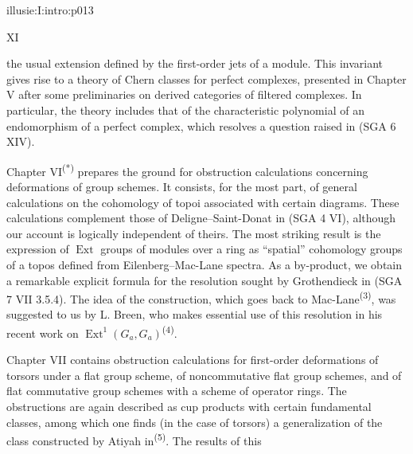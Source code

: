 \IllusieSetPhysicalPageSize{450.6bp}{704bp}
\begin{illusiefrontpage}{illusie:I:intro:p013}{}
\begin{center}\fontsize{10}{12}\selectfont XI\end{center}
\vspace{12bp}
\hypertarget{illusie:I:intro:p013:p1}{}%
the usual extension defined by the first-order jets of a module. This invariant
gives rise to a theory of Chern classes for perfect complexes, presented in
Chapter V after some preliminaries on derived categories of filtered complexes.
In particular, the theory includes that of the characteristic polynomial of an
endomorphism of a perfect complex, which resolves a question raised in
(SGA 6 XIV).

\vspace{4bp}
\hypertarget{illusie:I:intro:p013:p2}{}%
Chapter VI\textsuperscript{(*)} prepares the ground for obstruction calculations
concerning deformations of group schemes. It consists, for the most part, of
general calculations on the cohomology of topoi associated with certain diagrams.
These calculations complement those of Deligne--Saint-Donat in (SGA 4 VI),
although our account is logically independent of theirs. The most striking result
is the expression of $\operatorname{Ext}$ groups of modules over a ring as
``spatial'' cohomology groups of a topos defined from Eilenberg--Mac-Lane spectra.
As a by-product, we obtain a remarkable explicit formula for the resolution sought
by Grothendieck in (SGA 7 VII 3.5.4). The idea of the construction, which goes
back to Mac-Lane\textsuperscript{(3)}, was suggested to us by L. Breen, who makes
essential use of this resolution in his recent work on
$\operatorname{Ext}^{1}(G_a,G_a)$\textsuperscript{(4)}.

\vspace{4bp}
\hypertarget{illusie:I:intro:p013:p3}{}%
Chapter VII contains obstruction calculations for first-order deformations of
torsors under a flat group scheme, of noncommutative flat group schemes, and of
flat commutative group schemes with a scheme of operator rings. The obstructions
are again described as cup products with certain fundamental classes, among which
one finds (in the case of torsors) a generalization of the class constructed by
Atiyah in\textsuperscript{(5)}. The results of this

\IllusieNoteRule
{}\hypertarget{illusie:I:intro:p013:ns}{}%
\hypertarget{illusie:I:intro:p013:n3}{}%
\hypertarget{illusie:I:intro:p013:n4}{}%
\hypertarget{illusie:I:intro:p013:n5}{}%
\end{illusiefrontpage}
